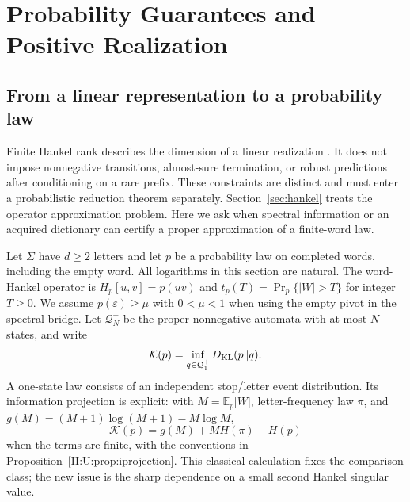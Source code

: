 \chapter{Probability Guarantees and Positive Realization}\label{sec:probability}

\section{From a linear representation to a probability law}
Finite Hankel rank describes the dimension of a linear realization
\citep{carlyle1971,fliess1974}. It
does not impose nonnegative transitions, almost-sure termination, or
robust predictions after conditioning on a rare prefix. These constraints
are distinct and must enter a probabilistic reduction theorem separately.
Section~\ref{sec:hankel} treats the operator approximation problem.
Here we ask when spectral information or an acquired dictionary can
certify a proper approximation of a finite-word law.

Let $\Sigma$ have $d\ge2$ letters and let $p$ be a probability law on
completed words, including the empty word. All logarithms in this section
are natural. The word-Hankel operator is $H_p[u,v]=p(uv)$ and
$t_p(T)=\Pr_p\{|W|>T\}$ for integer $T\ge0$. We assume
$p(\varepsilon)\ge\mu$ with $0<\mu<1$ when using the empty pivot in the spectral
bridge. Let $\mathcal Q_N^+$ be the proper nonnegative automata with
at most $N$ states, and write
\[
 \mathcal K(p)=\inf_{q\in\mathcal Q_1^+}D_{\rm KL}(p\|q).
\]
A one-state law consists of an independent stop/letter event distribution.
Its information projection is explicit: with $M=\mathbb E_p|W|$,
letter-frequency law $\pi$, and
$g(M)=(M+1)\log(M+1)-M\log M$,
\[
 \mathcal K(p)=g(M)+M H(\pi)-H(p)
\]
when the terms are finite, with the conventions in
Proposition~\ref{II:U:prop:iprojection}. This classical calculation fixes
the comparison class; the new issue is the sharp dependence on a small
second Hankel singular value.

